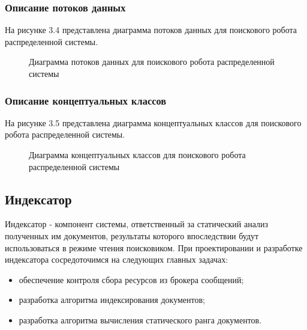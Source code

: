 \subsubsection{Описание потоков данных}

На рисунке 3.4 представлена диаграмма потоков данных для поискового робота распределенной системы.

\begin{figure}[H]
\caption{Диаграмма потоков данных для поискового робота распределенной системы}
\label{robot/diagram_dataflow:image}
\end{figure}

\subsubsection{Описание концептуальных классов}

На рисунке 3.5 представлена диаграмма концептуальных классов для поискового робота распределенной системы.

\begin{figure}[H]
\caption{Диаграмма концептуальных классов для поискового робота распределенной системы}
\label{robot/diagram_classes:image}
\end{figure}

\subsection{Индексатор}

Индексатор - компонент системы, ответственный за статический анализ полученных им документов, результаты которого впоследствии будут использоваться в режиме чтения поисковиком. 
При проектировании и разработке индексатора сосредоточимся на следующих главных задачах:
\begin{itemize}
\item обеспечение контроля сбора ресурсов из брокера сообщений;
\item разработка алгоритма индексирования документов;
\item разработка алгоритма вычисления статического ранга документов.
\end{itemize}

